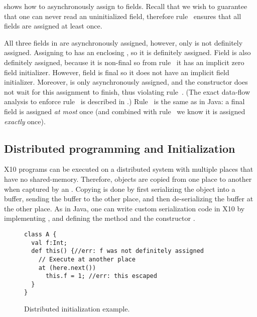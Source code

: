  shows how to asynchronously assign to fields.
Recall that we wish to guarantee that one can never read an uninitialized field,
    therefore rule~ ensures that all fields are assigned at least once.

All three fields in  are asynchronously assigned,
    however, only  is not definitely assigned.
Assigning to  has an enclosing , so
    it is definitely assigned.
Field  is also definitely assigned, because it is non-final
    so from rule~ it has an implicit zero field initializer.
However, field  is final so it does not have an implicit field initializer.
Moreover,  is only asynchronously assigned,
    and the constructor does not wait for this assignment to finish,
    thus violating rule~.
(The exact data-flow analysis to enforce rule~ is described in
    .)
Rule~ is the same as in Java: a final field is assigned \emph{at most} once
    (and combined with rule~ we know it is assigned \emph{exactly} once).


\subsection{Distributed programming and Initialization}
\label{Section:Multiple-Places}
X10 programs can be executed on a distributed system with multiple places
    that have no shared-memory.
Therefore, objects are copied from one place to another when captured by an .
Copying is done by first serializing the object into a buffer,
    sending the buffer to the other place, and then de-serializing the buffer at the other place.
As in Java, one can write custom serialization code in X10 by implementing ,
    and defining the method  and the constructor .


\begin{figure}
\begin{lstlisting}
class A {
  val f:Int;
  def this() {//err: f was not definitely assigned
    // Execute at another place
    at (here.next())
      this.f = 1; //err: this escaped
  }
}
\end{lstlisting}
\caption{Distributed initialization example. %
    }
\label{Figure:Multi-place}
\end{figure}


